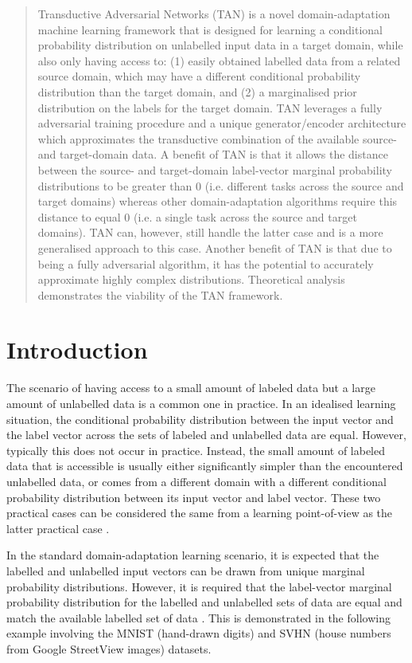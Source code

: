 \documentclass{article}
\begin{document}
\begin{abstract}
Transductive Adversarial Networks (TAN) is a novel domain-adaptation machine learning framework that is designed for learning a conditional probability distribution on unlabelled input data in a target domain, while also only having access to: (1) easily obtained labelled data from a related source domain, which may have a different conditional probability distribution than the target domain, and (2) a marginalised prior distribution on the labels for the target domain. TAN leverages a fully adversarial training procedure and a unique generator/encoder architecture which approximates the transductive combination of the available source- and target-domain data. A benefit of TAN is that it allows the distance between the source- and target-domain label-vector marginal probability distributions to be greater than 0 (i.e. different tasks across the source and target domains) whereas other domain-adaptation algorithms require this distance to equal 0 (i.e. a single task across the source and target domains). TAN can, however, still handle the latter case and is a more generalised approach to this case. Another benefit of TAN is that due to being a fully adversarial algorithm, it has the potential to accurately approximate highly complex distributions. Theoretical analysis demonstrates the viability of the TAN framework.
\end{abstract}

\section{Introduction}

The scenario of having access to a small amount of labeled data but a large amount of unlabelled data is a common one in practice. In an idealised learning situation, the conditional probability distribution between the input vector and the label vector across the sets of labeled and unlabelled data are equal. However, typically this does not occur in practice. Instead, the small amount of labeled data that is accessible is usually either significantly simpler than the encountered unlabelled data, or comes from a different domain with a different conditional probability distribution between its input vector and label vector. These two practical cases can be considered the same from a learning point-of-view as the latter practical case \cite{pan2010survey}. 

In the standard domain-adaptation learning scenario, it is expected that the labelled and unlabelled input vectors can be drawn from unique marginal probability distributions. However, it is required that the label-vector marginal probability distribution for the labelled and unlabelled sets of data are equal and match the available labelled set of data \cite{pan2010survey}. This is demonstrated in the following example involving the MNIST (hand-drawn digits) and SVHN (house numbers from Google StreetView images) datasets. 
\end{document}
